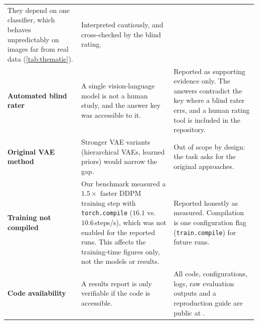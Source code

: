 \begin{table}[H]
\begin{tabularx}{\textwidth}{@{}>{\raggedright\arraybackslash}p{3.3cm}>{\raggedright\arraybackslash}X>{\raggedright\arraybackslash}X@{}}
They depend on one classifier, which behaves unpredictably on images far from real data (\cref{tab:thematic}). &
Interpreted cautiously, and cross-checked by the blind rating.\\
\addlinespace
\textbf{Automated blind rater} &
A single vision-language model is not a human study, and the answer key was accessible to it. &
Reported as supporting evidence only. The answers contradict the key where a blind rater errs, and a human rating
tool is included in the repository.\\
\addlinespace
\textbf{Original VAE method} &
Stronger VAE variants (hierarchical VAEs, learned priors) would narrow the gap. &
Out of scope by design: the task asks for the original approaches.\\
\addlinespace
\textbf{Training not compiled} &
Our benchmark measured a $1.5\times$ faster DDPM training step with \texttt{torch.compile} ($16.1$ vs.\
$10.6$\,steps/s), which was not enabled for the reported runs. This affects the training-time figures only, not the
models or results. &
Reported honestly as measured. Compilation is one configuration flag (\texttt{train.compile}) for future runs.\\
\addlinespace
\textbf{Code availability} &
A results report is only verifiable if the code is accessible. &
All code, configurations, logs, raw evaluation outputs and a reproduction guide are public at \repo.\\
\bottomrule
\end{tabularx}
\end{table}

